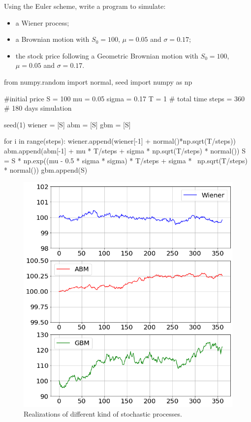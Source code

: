 \begin{question}
Using the Euler scheme, write a program to simulate:
\begin{itemize}
\item a Wiener process;
\item a Brownian motion with $S_0 = 100$, $\mu=0.05$ and $\sigma=0.17$;
\item the stock price following a Geometric Brownian motion with $S_0 = 100$, $\mu=0.05$ and $\sigma=0.17$.
\end{itemize}
\end{question}

\cprotEnv\begin{solution}
\begin{ipython}
from numpy.random import normal, seed
import numpy as np

#initial price
S = 100
mu = 0.05
sigma = 0.17
T = 1 # total time
steps = 360 # 180 days simulation

seed(1)
wiener = [S]
abm = [S]
gbm = [S]

for i in range(steps):
    wiener.append(wiener[-1] + normal()*np.sqrt(T/steps))
    abm.append(abm[-1] + mu * T/steps + sigma * np.sqrt(T/steps) * normal())
    S = S * np.exp((mu - 0.5 * sigma * sigma) * T/steps + sigma * \
                    np.sqrt(T/steps) * normal())
    gbm.append(S)
\end{ipython}

\begin{figure}[htbp]
\centering
\includegraphics[width=0.7\linewidth]{figures/ex_stochastic}
\caption{Realizations of different kind of stochastic processes.}
\end{figure}
\end{solution}

